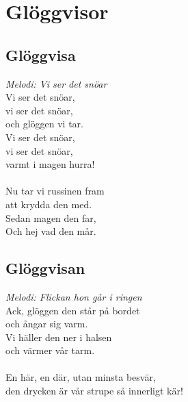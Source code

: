 \chapter{Glöggvisor}
\section{Glöggvisa}
\textit{Melodi: Vi ser det snöar}
\vspace{2mm}\\
Vi ser det snöar,\\
vi ser det snöar,\\
och glöggen vi tar.\\
Vi ser det snöar,\\
vi ser det snöar,\\
varmt i magen hurra!\\
\\
Nu tar vi russinen fram\\
att krydda den med.\\
Sedan magen den far,\\
Och hej vad den mår.

\section{Glöggvisan}
\textit{Melodi: Flickan hon går i ringen}
\vspace{2mm}\\
Ack, glöggen den står på bordet\\
och ångar sig varm.\\
Vi häller den ner i halsen\\
och värmer vår tarm.\\
\\
En här, en där, utan minsta besvär,\\
den drycken är vår strupe så innerligt kär!
